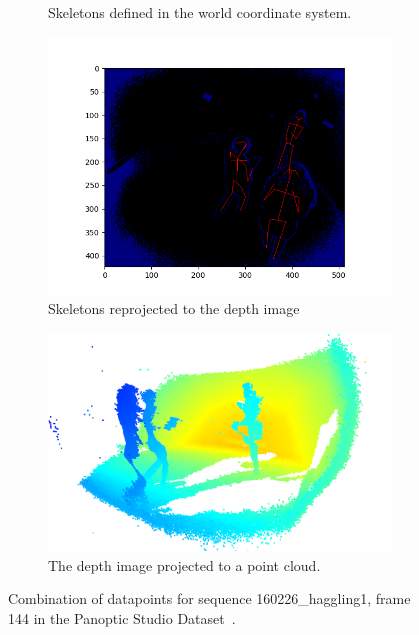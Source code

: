 \begin{figure}
\begin{subfigure}{.4\textwidth}
    \caption{Skeletons defined in the world coordinate system.}
    \label{fig:dataset_skeletons}
  \end{subfigure}%
  \newline
  \begin{subfigure}{.5\textwidth}
    \centering
    \includegraphics[width=\linewidth]{img/shifted_reprojection_fixed}
    \caption{Skeletons reprojected to the depth image}
    \label{fig:reprojected_skeletons}
  \end{subfigure}%
  \hspace{1em}
  \begin{subfigure}{.4\textwidth}
    \centering
    \includegraphics[width=\linewidth]{img/pointcloud}
    \caption{The depth image projected to a point cloud.}
    \label{fig:point_cloud}
  \end{subfigure}%
  \caption{Combination of datapoints for sequence 160226\_haggling1, frame 144 in the Panoptic Studio Dataset~\cite{Joo_2015_ICCV}.}
  \label{fig:skeleton_depth_duo}
\end{figure}

